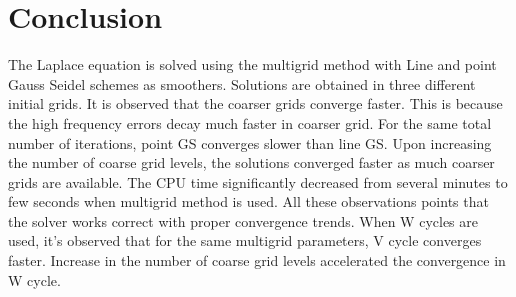 \documentclass[11pt]{report}
\begin{document}
\section{Conclusion}
The Laplace equation is solved using the multigrid method with Line and point Gauss Seidel schemes as 
smoothers. Solutions are obtained in three different initial grids. It is observed that the coarser grids converge faster. This is because the high frequency errors decay much faster in coarser grid. 
For the same total number of iterations, point GS converges slower than line GS. Upon increasing the number of coarse grid levels, the solutions converged faster as much coarser grids are available. The CPU time significantly decreased from several minutes to few seconds when multigrid method is used. All these observations points 
that the solver works correct with proper convergence trends. When W cycles are used, it's observed that for the same multigrid parameters, V cycle converges faster. Increase in the number of coarse grid levels accelerated the convergence in W cycle. 
\end{document}
